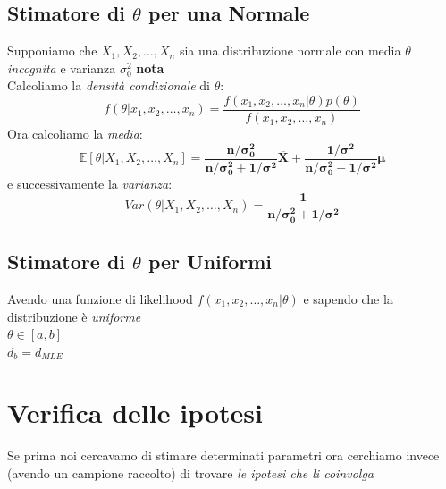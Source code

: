 \documentclass[]{article}
\newcommand{\ev}{\mathbb{E}[X]}
\renewcommand{\ev}[1]{\mathbb{E}\left[#1\right]}
\begin{document}
    \subsection{Stimatore di $\theta$ per una Normale}
    Supponiamo che $X_1, X_2, \ldots, X_n$ sia una distribuzione normale con media $\theta$ \textit{incognita} e varianza $\sigma^2_0$ \textbf{nota} \\[2ex]
    Calcoliamo la \textit{densità condizionale} di $\theta$:
    \[ f(\theta \rvert x_1, x_2, \ldots, x_n) = \frac{f(x_1, x_2, \ldots, x_n \rvert \theta) p(\theta)}{f(x_1, x_2, \ldots, x_n)} \]
    Ora calcoliamo la \textit{media}:
    \[ \ev{\theta \rvert X_1, X_2, \ldots, X_n } = \boldsymbol{\frac{n / \sigma^2_0}{n / \sigma^2_0 + 1 / \sigma^2} \overline{X} + \frac{1 / \sigma^2}{n / \sigma^2_0 + 1 / \sigma^2} \mu} \]
    e successivamente la \textit{varianza}:
    \[ Var(\theta \rvert X_1, X_2, \ldots, X_n) = \boldsymbol{\frac{1}{n / \sigma^2_0 + 1 / \sigma^2}} \]
    \subsection{Stimatore di $\theta$ per Uniformi}
    Avendo una funzione di likelihood $f(x_1, x_2, \ldots, x_n \rvert \theta)$ e sapendo che la distribuzione è \textit{uniforme} \\
    $\theta \in [a,b]$ \\
    $d_b = d_{MLE}$
    \section{Verifica delle ipotesi}
    Se prima noi cercavamo di stimare determinati parametri ora cerchiamo invece (avendo un campione raccolto) di trovare \textit{le ipotesi che li coinvolga}
\end{document}
